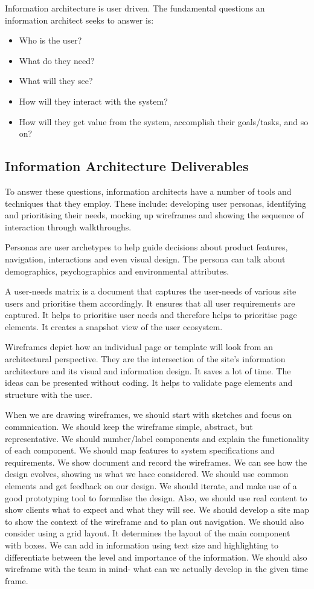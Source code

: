 \documentclass[a4paper, openany]{memoir}
\begin{document}
\noindent Information architecture is user driven. The fundamental questions an information architect seeks to answer is:
\begin{itemize}
    \item Who is the user?
    \item What do they need?
    \item What will they see?
    \item How will they interact with the system?
    \item How will they get value from the system, accomplish their goals/tasks, and so on?
\end{itemize}

\subsection{Information Architecture Deliverables}
To answer these questions, information architects have a number of tools and techniques that they employ. These include: developing user personas, identifying and prioritising their needs, mocking up wireframes and showing the sequence of interaction through walkthroughs.

\noindent Personas are user archetypes to help guide decisions about product features, navigation, interactions and even visual design. The persona can talk about demographics, psychographics and environmental attributes.

\noindent A user-needs matrix is a document that captures the user-needs of various site users and prioritise them accordingly. It ensures that all user requirements are captured. It helps to prioritise user needs and therefore helps to prioritise page elements. It creates a snapshot view of the user ecosystem.

\noindent Wireframes depict how an individual page or template will look from an architectural perspective. They are the intersection of the site's information architecture and its visual and information design. It saves a lot of time. The ideas can be presented without coding. It helps to validate page elements and structure with the user.

\noindent When we are drawing wireframes, we should start with sketches and focus on commnication. We should keep the wireframe simple, abstract, but representative. We should number/label components and explain the functionality of each component. We should map features to system specifications and requirements. We show document and record the wireframes. We can see how the design evolves, showing us what we hace considered. We should use common elements and get feedback on our design. We should iterate, and make use of a good prototyping tool to formalise the design. Also, we should use real content to show clients what to expect and what they will see. We should develop a site map to show the context of the wireframe and to plan out navigation. We should also consider using a grid layout. It determines the layout of the main component with boxes. We can add in information using text size and highlighting to differentiate between the level and importance of the information. We should also wireframe with the team in mind- what can we actually develop in the given time frame.
\end{document}
